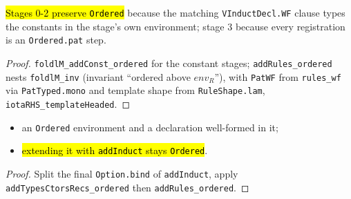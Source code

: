 \begin{lemma}
\label{family:indlem-stage-ordered}
\leanok
{} 

 \hl{Stages 0-2 preserve \texttt{Ordered}} because the matching
\texttt{VInductDecl.WF} clause types the constants in the stage's own environment; stage 3
because every registration is an \texttt{Ordered.pat} step.
\end{lemma}
\begin{proof}
\leanok
{} \texttt{foldlM\_addConst\_ordered} for the constant stages;
\texttt{addRules\_ordered} nests \texttt{foldlM\_inv} (invariant ``ordered above $env_R$''),
with \texttt{PatWF} from \texttt{rules\_wf} via \texttt{PatTyped.mono} and template shape
from \texttt{RuleShape.lam}, \texttt{iotaRHS\_templateHeaded}.
\end{proof}

\begin{theorem}
\label{thm:indlem-add-induct-wf}
\leanok
{} 
\begin{itemize}
\item {} an \texttt{Ordered} environment and a declaration well-formed in it;
\item {} \hl{extending it with \texttt{addInduct} stays \texttt{Ordered}}.
\end{itemize}
\end{theorem}
\begin{proof}
\leanok
{} Split the final \texttt{Option.bind} of \texttt{addInduct}, apply
\texttt{addTypesCtorsRecs\_ordered} then \texttt{addRules\_ordered}.
\end{proof}

